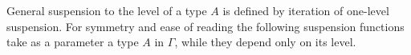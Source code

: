 {\begin{code}
\\
\>  \AgdaInductiveConstructor{,}  \AgdaInductiveConstructor{,} \AgdaSymbol{(} \AgdaSymbol{(} \AgdaSymbol{)}   \AgdaSymbol{))} \AgdaSymbol{(} \AgdaSymbol{\{}\AgdaSymbol{\}}  \AgdaSymbol{\{}\AgdaSymbol{\}} \AgdaSymbol{)} \AgdaSymbol{=}      \AgdaSymbol{(}  \AgdaInductiveConstructor{,}   \AgdaInductiveConstructor{,} \AgdaSymbol{))}\<%
\\
\>[22]\<[65]%
\>[65]\AgdaSymbol{(} \AgdaSymbol{(} \AgdaSymbol{(} \AgdaSymbol{(}  \AgdaSymbol{))} \AgdaSymbol{)}\<%
\\
\>[65]\<[66]%
\>[66]\AgdaSymbol{(} \AgdaSymbol{(} \AgdaSymbol{(}  \AgdaSymbol{))} \AgdaSymbol{))}\<%
\\
\>[0]\<[65]%
\>[65]\AgdaSymbol{(} \AgdaSymbol{(}  \AgdaSymbol{)} \AgdaSymbol{\{} \AgdaSymbol{\}} \AgdaSymbol{(} \AgdaSymbol{))}\<%
\\
\>\<\end{code}}
General suspension to the level of a type $A$ is defined by iteration of
one-level suspension. For symmetry and ease of reading the following
suspension functions take as a parameter a type $A$ in $\Gamma$, while they
depend only on its level. 

